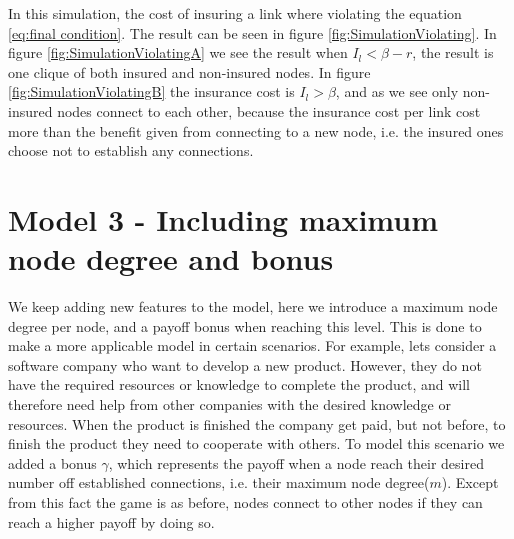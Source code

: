 In this simulation, the cost of insuring a link where violating the equation \ref{eq:final condition}. The result can be seen in figure \ref{fig:SimulationViolating}.  In figure \ref{fig:SimulationViolatingA} we see the result when $I_{l}<\beta-r$, the result is one clique of both insured and non-insured nodes. In figure \ref{fig:SimulationViolatingB} the insurance cost is $I_{l}>\beta$, and as we see only non-insured nodes connect to each other, because the insurance cost per link cost more than the benefit given from connecting to a new node, i.e. the insured ones choose not to establish any connections. 

\section{Model 3 - Including maximum node degree and bonus}
We keep adding new features to the model, here we introduce a maximum node degree per node, and a payoff bonus when reaching this level. This is done to make a more applicable model in certain scenarios. For example, lets consider a software company who want to develop a new product. However, they do not have the required resources or knowledge to complete the product, and will therefore need help from other companies with the desired knowledge or resources. When the product is finished the company get paid, but not before, to finish the product they need to cooperate with others.
To model this scenario we added a bonus $\gamma$, which represents the payoff when a node reach their desired number off established connections, i.e. their maximum node degree($m$). Except from this fact the game is as before, nodes connect to other nodes if they can reach a higher payoff by doing so. 



